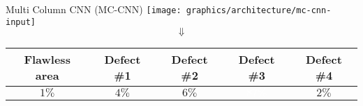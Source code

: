 \begin{frame}{Multi Column CNN (MC-CNN)}
    \texttt{[image: graphics/architecture/mc-cnn-input]}
    $$\Downarrow$$
    \centering
    \begin{tabular}{|c|c|c|c|c|}
        \hline
        Flawless area & Defect \#1 & Defect \#2 & Defect \#3 & Defect \#4\\\hline
        $1\%$ & $4\%$ & $6\%$ & \cellcolor{UniBlue}\textcolor{white}{$87\%$} & $2\%$ \\
        \hline
    \end{tabular}
\end{frame}

